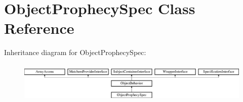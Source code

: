 \section{Object\+Prophecy\+Spec Class Reference}
\label{classspec_1_1_prophecy_1_1_prophecy_1_1_object_prophecy_spec}
Inheritance diagram for Object\+Prophecy\+Spec\+:\begin{figure}[H]
\begin{center}
\leavevmode
\includegraphics[height=1.953488cm]{classspec_1_1_prophecy_1_1_prophecy_1_1_object_prophecy_spec}
\end{center}
\end{figure}
